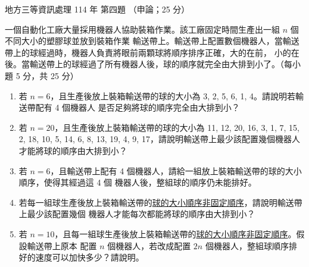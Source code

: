 \begin{pastexam}[label={px:df3-114-ds-04}]{地方三等資訊處理 114 年 第四題}
（申論；25 分）

一個自動化工廠大量採用機器人協助裝箱作業。該工廠固定時間生產出一組 $n$ 個不同大小的塑膠球並放到裝箱作業
輸送帶上。輸送帶上配置數個機器人，當輸送帶上的球經過時，機器人負責將眼前兩顆球將順序排序正確，大的在前，
小的在後。當輸送帶上的球經過了所有機器人後，球的順序就完全由大排到小了。（每小題 5 分，共 25 分）
\begin{enumerate}[leftmargin=2.2em]
\item[㈠] 若 $n = 6$，且生產後放上裝箱輸送帶的球的大小為 3, 2, 5, 6, 1, 4。請說明若輸送帶配有 4 個機器人
是否足夠將球的順序完全由大排到小？
\item[㈡] 若 $n = 20$，且生產後放上裝箱輸送帶的球的大小為 11, 12, 20, 16, 3, 1, 7, 15, 2, 18, 10, 5, 14, 6, 8,
13, 19, 4, 9, 17，請說明輸送帶上最少該配置幾個機器人才能將球的順序由大排到小？
\item[㈢] 若 $n = 6$，且輸送帶上配有 4 個機器人，請給一組放上裝箱輸送帶的球的大小順序，使得其經過這 4 個
機器人後，整組球的順序仍未能排好。
\item[㈣] 若每一組球生產後放上裝箱輸送帶的\underline{球的大小順序非固定順序}，請說明輸送帶上最少該配置幾個
機器人才能每次都能將球的順序由大排到小？
\item[㈤] 若 $n = 10$，且每一組球生產後放上裝箱輸送帶的\underline{球的大小順序非固定順序}。假設輸送帶上原本
配置 $n$ 個機器人，若改成配置 $2n$ 個機器人，整組球順序排好的速度可以加快多少？請說明。
\end{enumerate}
\end{pastexam}

